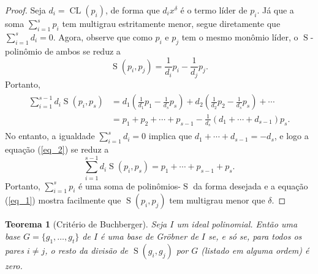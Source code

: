 \documentclass[12pt,a4paper]{report}
\newtheorem{theorem}{Teorema}
\numberwithin{theorem}{chapter}
\DeclareMathOperator{\CL}{CL}
\DeclareMathOperator{\Sp}{S}
\begin{document}
\begin{proof}
  Seja \(d_i = \CL(p_i)\), de forma que \(d_ix^\delta\) é o termo
  líder de \(p_i\).  Já que a soma \(\sum_{i=1}^s{p_i}\) tem multigrau
  estritamente menor, segue diretamente que \(\sum_{i=1}^sd_i = 0\).
  Agora, observe que como \(p_i\) e \(p_j\) tem o mesmo monômio líder,
  o \(\Sp\)-polinômio de ambos se reduz a
  \begin{equation}\label{eq_1}
    \Sp(p_i,p_j) = \frac{1}{d_i}p_i - \frac{1}{d_j}p_j.
  \end{equation}
  Portanto,
  \begin{align}\label{eq_2}
    \begin{split}
      \sum_{i=1}^{s-1}{d_i\Sp(p_i,p_s)} &= d_1\left(\frac{1}{d_1}p_1 -
        \frac{1}{d_s}p_s\right) + d_2\left(\frac{1}{d_2}p_2 -
        \frac{1}{d_s}p_s\right) + \cdots \\
      &= p_1 + p_2 + \cdots + p_{s-1} -
      \frac{1}{d_s}(d_1+\cdots+d_{s-1})p_s.
    \end{split}
  \end{align}
  No entanto, a igualdade \(\sum_{i=1}^sd_i = 0\) implica que \(d_1 +
  \cdots + d_{s-1} = -d_s\), e logo a equação (\ref{eq_2}) se reduz a
  \[\sum_{i=1}^{s-1}{d_i\Sp(p_i,p_s) = p_1 + \cdots + p_{s-1} + p_s}.\]
  Portanto, \(\sum_{i=1}^s{p_i}\) é uma soma de polinômios-\(\Sp\) da
  forma desejada e a equação (\ref{eq_1}) mostra facilmente que
  \(\Sp(p_i,p_j)\) tem multigrau menor que \(\delta\).
\end{proof}

\begin{theorem}[Critério de Buchberger]
  Seja \(I\) um ideal polinomial.  Então uma base \(G =
  \{g_1,\ldots,g_t\}\) de \(I\) é uma base de Gröbner de \(I\) se, e
  só se, para todos os pares \(i \neq j\), o resto da divisão de
  \(\Sp(g_i,g_j)\) por \(G\) (listado em alguma ordem) é zero.
\end{theorem}
\end{document}
